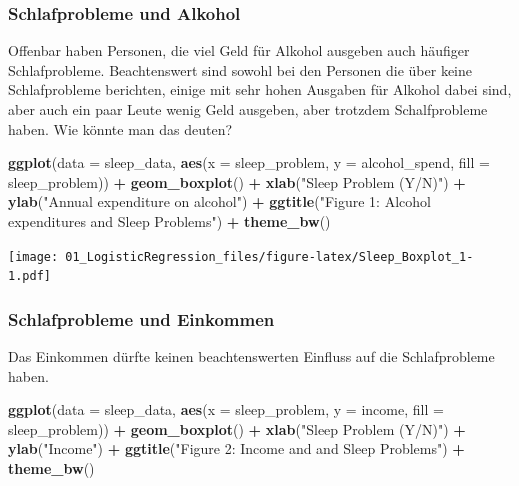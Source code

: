 \documentclass[
]{article}
\newenvironment{Shaded}{\begin{snugshade}}{\end{snugshade}}
\newcommand{\AttributeTok}[1]{\textcolor[rgb]{0.13,0.29,0.53}{#1}}
\newcommand{\FunctionTok}[1]{\textcolor[rgb]{0.13,0.29,0.53}{\textbf{#1}}}
\newcommand{\NormalTok}[1]{#1}
\newcommand{\SpecialCharTok}[1]{\textcolor[rgb]{0.81,0.36,0.00}{\textbf{#1}}}
\newcommand{\StringTok}[1]{\textcolor[rgb]{0.31,0.60,0.02}{#1}}
\begin{document}
\subsubsection{Schlafprobleme und Alkohol}\label{schlafprobleme-und-alkohol}

Offenbar haben Personen, die viel Geld für Alkohol ausgeben auch häufiger Schlafprobleme. Beachtenswert sind sowohl bei den Personen die über keine Schlafprobleme berichten, einige mit sehr hohen Ausgaben für Alkohol dabei sind, aber auch ein paar Leute wenig Geld ausgeben, aber trotzdem Schalfprobleme haben. Wie könnte man das deuten?

\begin{Shaded}
\begin{Highlighting}[]
  \FunctionTok{ggplot}\NormalTok{(}\AttributeTok{data =}\NormalTok{ sleep\_data, }\FunctionTok{aes}\NormalTok{(}\AttributeTok{x =}\NormalTok{ sleep\_problem, }
                                \AttributeTok{y =}\NormalTok{ alcohol\_spend, }
                                \AttributeTok{fill =}\NormalTok{ sleep\_problem)) }\SpecialCharTok{+}
    \FunctionTok{geom\_boxplot}\NormalTok{() }\SpecialCharTok{+} 
    \FunctionTok{xlab}\NormalTok{(}\StringTok{"Sleep Problem (Y/N)"}\NormalTok{) }\SpecialCharTok{+} 
    \FunctionTok{ylab}\NormalTok{(}\StringTok{"Annual expenditure on alcohol"}\NormalTok{) }\SpecialCharTok{+} 
    \FunctionTok{ggtitle}\NormalTok{(}\StringTok{"Figure 1: Alcohol expenditures and Sleep Problems"}\NormalTok{) }\SpecialCharTok{+}
    \FunctionTok{theme\_bw}\NormalTok{()}
\end{Highlighting}
\end{Shaded}

\texttt{[image: 01\_LogisticRegression\_files/figure-latex/Sleep\_Boxplot\_1-1.pdf]}

\subsubsection{Schlafprobleme und Einkommen}\label{schlafprobleme-und-einkommen}

Das Einkommen dürfte keinen beachtenswerten Einfluss auf die Schlafprobleme haben.

\begin{Shaded}
\begin{Highlighting}[]
  \FunctionTok{ggplot}\NormalTok{(}\AttributeTok{data =}\NormalTok{ sleep\_data, }\FunctionTok{aes}\NormalTok{(}\AttributeTok{x =}\NormalTok{ sleep\_problem, }\AttributeTok{y =}\NormalTok{ income, }\AttributeTok{fill =}\NormalTok{ sleep\_problem)) }\SpecialCharTok{+} 
    \FunctionTok{geom\_boxplot}\NormalTok{() }\SpecialCharTok{+} 
    \FunctionTok{xlab}\NormalTok{(}\StringTok{"Sleep Problem (Y/N)"}\NormalTok{) }\SpecialCharTok{+} 
    \FunctionTok{ylab}\NormalTok{(}\StringTok{"Income"}\NormalTok{) }\SpecialCharTok{+} 
    \FunctionTok{ggtitle}\NormalTok{(}\StringTok{"Figure 2: Income and and Sleep Problems"}\NormalTok{) }\SpecialCharTok{+}
    \FunctionTok{theme\_bw}\NormalTok{()}
\end{Highlighting}
\end{Shaded}
\end{document}
